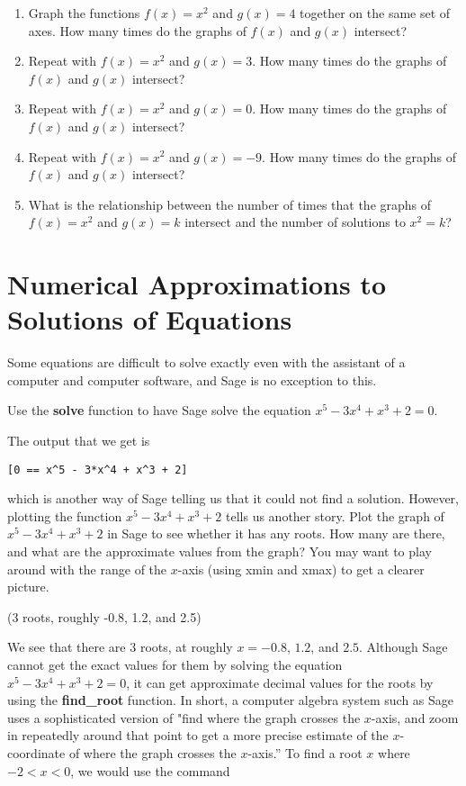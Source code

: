 \begin{enumerate}
	\item Graph the functions $f(x)=x^2$ and $g(x)=4$ together
		on the same set of axes. How many times do the
		graphs of $f(x)$ and $g(x)$ intersect?
	\item Repeat with $f(x)=x^2$ and $g(x)=3$. How many times do the
		graphs of $f(x)$ and $g(x)$ intersect?
	\item Repeat with $f(x)=x^2$ and $g(x)=0$. How many times do the
		graphs of $f(x)$ and $g(x)$ intersect?
	\item Repeat with $f(x)=x^2$ and $g(x)=-9$. How many times do the
		graphs of $f(x)$ and $g(x)$ intersect?
	\item What is the relationship between the number of times
		that the graphs of $f(x)=x^2$ and $g(x)=k$ intersect and the
		number of solutions to $x^2=k$?
\end{enumerate}

\section{Numerical Approximations to Solutions of Equations}

Some equations are difficult to solve exactly even with the
assistant of a computer and computer software, and Sage is no
exception to this. 

Use the \textbf{solve} function to have Sage solve the
equation $x^5-3x^4+x^3+2=0$. 

The output that we get is
\begin{verbatim}
[0 == x^5 - 3*x^4 + x^3 + 2]
\end{verbatim}

which is another way of Sage telling us that it could not find a solution.
However, plotting the function $x^5-3x^4+x^3+2$ tells us another story.
Plot the graph of $x^5-3x^4+x^3+2$ in Sage to see whether it has
any roots. How many are there, and what are the approximate values
from the graph? You may want to play around with the range of the
$x$-axis (using xmin and xmax) to get a clearer picture.

(3 roots, roughly -0.8, 1.2, and 2.5)

We see that there are 3 roots, at roughly $x=-0.8$, $1.2$, and $2.5$.
Although Sage cannot get the exact values for them by solving
the equation $x^5-3x^4+x^3+2=0$, it can get approximate decimal
values for the roots by using the \textbf{find\_root} function. In
short, a computer algebra system such as Sage uses a sophisticated
version of "find where the graph crosses the $x$-axis, and zoom in
repeatedly around that point to get a more precise estimate of the
$x$-coordinate of where the graph crosses the $x$-axis.'' To find
a root $x$ where $-2<x<0$, we would use the command

